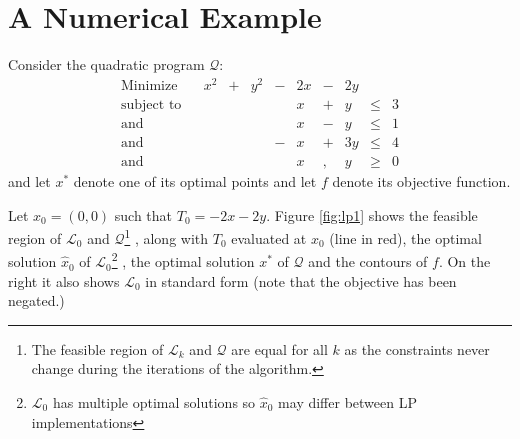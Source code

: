\section{A Numerical Example}
\label{sec:example}
Consider the quadratic program $\mathcal{Q}$:
\[
\begin{array}{lcrcrcrcrcl}
\textrm{Minimize}   & & x^2 &+& y^2 &-& 2 x &-& 2 y \\
\textrm{subject to} & &     & &     & &   x &+&   y &\leq& 3 \\
\textrm{and}        & &     & &     & &   x &-&   y &\leq& 1 \\
\textrm{and}        & &     & &     &-&   x &+& 3 y &\leq& 4 \\
\textrm{and}        & &     & &     & &   x &,&   y &\geq& 0
\end{array}
\]
and let $x^*$ denote one of its optimal points and let $f$ denote its objective
function.

Let $x_0 = (0,0)$ such that $T_0 = -2x - 2y$.
Figure \ref{fig:lp1} shows the feasible region of $\mathcal{L}_0$ and
$\mathcal{Q}$\footnote{
    The feasible region of $\mathcal{L}_k$ and $\mathcal{Q}$ are equal for all
    $k$ as the constraints never change during the iterations of the algorithm.
}
, along with $T_0$ evaluated at $x_0$ (line in red), the optimal solution
$\hat{x}_0$ of $\mathcal{L}_0$\footnote{
    $\mathcal{L}_0$ has multiple optimal solutions so $\hat{x}_0$ may differ
    between LP implementations
}
, the optimal solution $x^*$ of $\mathcal{Q}$ and the contours of $f$.
On the right it also shows $\mathcal{L}_0$ in standard form (note that the
objective has been negated.)



